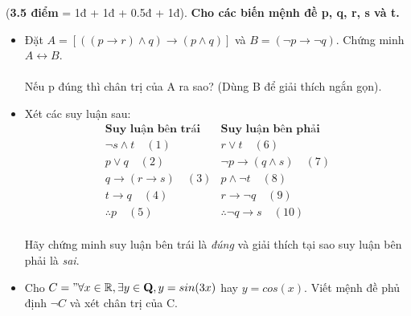 \documentclass[a4paper]{exam}
\begin{document}
	\begin{center}
	\end{center}
	
	\vspace*{2mm}
	
	\begin{questions}
		\question (\textbf{3.5 điểm} = 1đ + 1đ + 0.5đ + 1đ). \textbf{Cho các biến mệnh đề p, q, r, s và t.}
		\begin{itemize}
			\item Đặt $A = \left[((p \longrightarrow r) \land q) \longrightarrow (p \land q) \right]$ và $B = (\neg p \longrightarrow \neg q)$. Chứng minh $A \longleftrightarrow B$.\\
			\\Nếu p đúng thì chân trị của A ra sao? (Dùng B để giải thích ngắn gọn).\\
			\item Xét các suy luận sau:\\
			\[
			\begin{array}{c|c}
				\textbf{Suy luận bên trái} & \textbf{Suy luận bên phải}\\
				\hline
				\neg s \land t \quad (1) & r \lor t \quad (6)\\[1mm]
				p \lor q \quad (2) & \neg p \longrightarrow (q \land s) \quad (7)\\[1mm]
				q \longrightarrow (r \longrightarrow s) \quad (3) & p \land \neg t \quad (8)\\[1mm]
				t \longrightarrow q \quad (4) & r \longrightarrow \neg q \quad (9)\\[1mm]
				\hline
				\therefore p \quad (5) & \therefore \neg q \longrightarrow s \quad (10)
			\end{array}
			\]\\
			Hãy chứng minh suy luận bên trái là \textit{đúng} và giải thích tại sao suy luận bên phải là \textit{sai}.\\
			\item Cho $C = "\forall x \in \mathbb{R}, \exists y \in \mathbf{Q}, y = sin(3x)$ hay $y = cos(x)$. Viết mệnh đề phủ định $\neg C$ và xét chân trị của C.\\

\end{itemize}
\end{questions}
\end{document}
